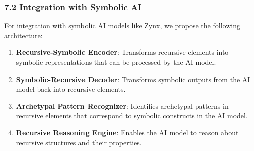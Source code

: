 \documentclass[
]{article}
\begin{document}
\subsubsection{7.2 Integration with Symbolic
AI}\label{integration-with-symbolic-ai}

For integration with symbolic AI models like Zynx, we propose the
following architecture:

\begin{enumerate}
\def\labelenumi{\arabic{enumi}.}
\item
  \textbf{Recursive-Symbolic Encoder}: Transforms recursive elements
  into symbolic representations that can be processed by the AI model.
\item
  \textbf{Symbolic-Recursive Decoder}: Transforms symbolic outputs from
  the AI model back into recursive elements.
\item
  \textbf{Archetypal Pattern Recognizer}: Identifies archetypal patterns
  in recursive elements that correspond to symbolic constructs in the AI
  model.
\item
  \textbf{Recursive Reasoning Engine}: Enables the AI model to reason
  about recursive structures and their properties.
\end{enumerate}
\end{document}
